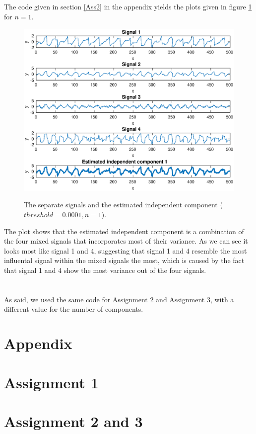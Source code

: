 \documentclass[10pt]{article}
\begin{document}
\subsection{}


\subsection{}
The code given in section \ref{Ass2} in the appendix yields the plots given in figure \ref{fig2.1} for $n = 1$.
\begin{figure}
  \centering
  \caption{The separate signals and the estimated independent component ($threshold = 0.0001, n = 1$).}
    \includegraphics[width=\columnwidth]{Ass2.eps}
  \label{fig2.1}
\end{figure}
The plot shows that the estimated independent component is a combination of the four mixed signals that incorporates most of their variance. As we can see it looks most like signal 1 and 4, suggesting that signal 1 and 4 resemble the most influental signal within the mixed signals the most, which is caused by the fact that signal 1 and 4 show the most variance out of the four signals.

\section{}
As said, we used the same code for Assignment 2 and Assignment 3, with a different value for the number of components.

\newpage
\section*{Appendix}
\appendix
\section{Assignment 1}
{\label{Ass1}}
\section{Assignment 2 and 3}
{\label{Ass2}}
\end{document}
